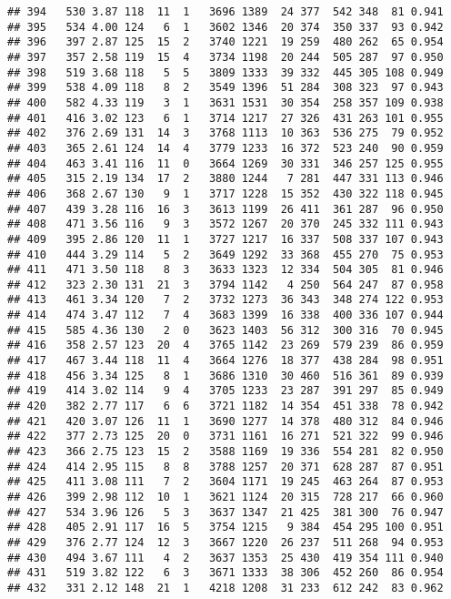 \documentclass[]{article}
\begin{document}
\begin{verbatim}
## 394   530 3.87 118  11  1   3696 1389  24 377  542 348  81 0.941
## 395   534 4.00 124   6  1   3602 1346  20 374  350 337  93 0.942
## 396   397 2.87 125  15  2   3740 1221  19 259  480 262  65 0.954
## 397   357 2.58 119  15  4   3734 1198  20 244  505 287  97 0.950
## 398   519 3.68 118   5  5   3809 1333  39 332  445 305 108 0.949
## 399   538 4.09 118   8  2   3549 1396  51 284  308 323  97 0.943
## 400   582 4.33 119   3  1   3631 1531  30 354  258 357 109 0.938
## 401   416 3.02 123   6  1   3714 1217  27 326  431 263 101 0.955
## 402   376 2.69 131  14  3   3768 1113  10 363  536 275  79 0.952
## 403   365 2.61 124  14  4   3779 1233  16 372  523 240  90 0.959
## 404   463 3.41 116  11  0   3664 1269  30 331  346 257 125 0.955
## 405   315 2.19 134  17  2   3880 1244   7 281  447 331 113 0.946
## 406   368 2.67 130   9  1   3717 1228  15 352  430 322 118 0.945
## 407   439 3.28 116  16  3   3613 1199  26 411  361 287  96 0.950
## 408   471 3.56 116   9  3   3572 1267  20 370  245 332 111 0.943
## 409   395 2.86 120  11  1   3727 1217  16 337  508 337 107 0.943
## 410   444 3.29 114   5  2   3649 1292  33 368  455 270  75 0.953
## 411   471 3.50 118   8  3   3633 1323  12 334  504 305  81 0.946
## 412   323 2.30 131  21  3   3794 1142   4 250  564 247  87 0.958
## 413   461 3.34 120   7  2   3732 1273  36 343  348 274 122 0.953
## 414   474 3.47 112   7  4   3683 1399  16 338  400 336 107 0.944
## 415   585 4.36 130   2  0   3623 1403  56 312  300 316  70 0.945
## 416   358 2.57 123  20  4   3765 1142  23 269  579 239  86 0.959
## 417   467 3.44 118  11  4   3664 1276  18 377  438 284  98 0.951
## 418   456 3.34 125   8  1   3686 1310  30 460  516 361  89 0.939
## 419   414 3.02 114   9  4   3705 1233  23 287  391 297  85 0.949
## 420   382 2.77 117   6  6   3721 1182  14 354  451 338  78 0.942
## 421   420 3.07 126  11  1   3690 1277  14 378  480 312  84 0.946
## 422   377 2.73 125  20  0   3731 1161  16 271  521 322  99 0.946
## 423   366 2.75 123  15  2   3588 1169  19 336  554 281  82 0.950
## 424   414 2.95 115   8  8   3788 1257  20 371  628 287  87 0.951
## 425   411 3.08 111   7  2   3604 1171  19 245  463 264  87 0.953
## 426   399 2.98 112  10  1   3621 1124  20 315  728 217  66 0.960
## 427   534 3.96 126   5  3   3637 1347  21 425  381 300  76 0.947
## 428   405 2.91 117  16  5   3754 1215   9 384  454 295 100 0.951
## 429   376 2.77 124  12  3   3667 1220  26 237  511 268  94 0.953
## 430   494 3.67 111   4  2   3637 1353  25 430  419 354 111 0.940
## 431   519 3.82 122   6  3   3671 1333  38 306  452 260  86 0.954
## 432   331 2.12 148  21  1   4218 1208  31 233  612 242  83 0.962

\end{verbatim}
\end{document}
